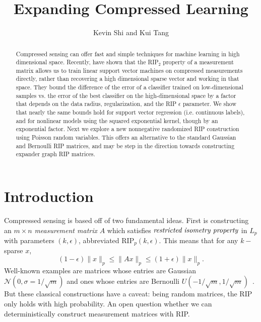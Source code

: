 \documentclass[english]{article}
\theoremstyle{plain}
\begin{document}
\title{Expanding Compressed Learning}

\author{Kevin Shi and Kui Tang}
\maketitle
\begin{abstract}
Compressed sensing can offer fast and simple techniques for machine learning in high dimensional space. Recently, \citet{Calderbank09} have shown that the RIP$_2$ property of a measurement matrix allows us to train linear support vector machines on compressed measurements directly, rather than recovering a high dimensional sparse vector and working in that space.
They bound the difference of the error of a classifier trained on low-dimensional samples vs. the error of the best classifier on the high-dimensional space by a factor that depends on the data radius, regularization, and the RIP $\epsilon$ parameter.
We show that nearly the same bounds hold for support vector regression (i.e. continuous labels), and for nonlinear models using the squared exponential kernel, though by an exponential factor.
Next we explore a new nonnegative randomized RIP construction using Poisson random variables.
This offers an alternative to the standard Gaussian and Bernoulli RIP matrices, and may be step in the direction towards constructing expander graph RIP matrices.
\end{abstract}

\section{Introduction}

Compressed sensing is based off of two fundamental ideas.
First is constructing an $m \times n$ \emph{measurement matrix} $A$ which satisfies $\emph{restricted isometry property}$ in $L_p$ with parameters $(k,\epsilon)$, abbreviated $\mbox{RIP}_p(k,\epsilon)$.
This means that for any $k-$sparse $x$,
\[
(1-\epsilon)\|x\|_p \le\|Ax\|_p \le (1+\epsilon)\|x\|_p. \label{eq:RIP}
\]
Well-known examples are matrices whose entries are Gaussian $\mathcal{N}(0,\sigma=1/\sqrt{m})$ and ones whose entries are Bernoulli $U(-1/\sqrt{m},1/\sqrt{m})$~\citep{Baraniuk08}.
But these classical constructions have a caveat: being random matrices, the RIP only holds with high probability.
An open question whether we can deterministically construct measurement matrices with RIP.
\end{document}
